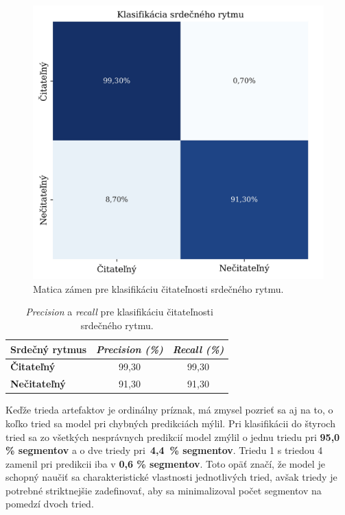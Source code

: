 \begin{figure}[H]
    \centering    
    \includegraphics[scale=0.07]{img/confusion_matrix_HR.jpeg}
    \caption{Matica zámen pre klasifikáciu čitateľnosti srdečného rytmu.}
    \label{fig:artefact_classification_HR}
\end{figure}

\begin{table}[H]\centering
\caption[\textit{Precision} a \textit{recall} pre klasifikáciu čitateľnosti srdečného rytmu.]{~\textit{Precision} a \textit{recall} pre klasifikáciu čitateľnosti srdečného rytmu.}\label{tab:artefact_classification_HR}
    \begin{tabular}{l|c|c}
    	\textbf{Srdečný rytmus} & \textit{\textbf{Precision (\%)}} & \textit{\textbf{Recall (\%)}} \tabularnewline \hline 
     	\textbf{Čitateľný}      & 99,30	                      &  99,30                           \tabularnewline \hline
        \textbf{Nečitateľný}	& 91,30	                      &  91,30                          \tabularnewline
    \end{tabular}
\end{table}


Keďže trieda artefaktov je ordinálny príznak, má zmysel pozrieť sa aj na to, o koľko tried sa model pri chybných predikciách mýlil. Pri klasifikácii do štyroch tried sa zo všetkých nesprávnych predikcií model zmýlil o jednu triedu pri \textbf{95,0 \% segmentov} a o dve triedy pri~\textbf{4,4~\% segmentov}. Triedu 1 s triedou 4 zamenil pri predikcii iba v \textbf{0,6 \% segmentov}. Toto opäť značí, že model je schopný naučiť sa charakteristické vlastnosti jednotlivých tried, avšak triedy je potrebné striktnejšie zadefinovať, aby sa minimalizoval počet segmentov na pomedzí dvoch tried.


